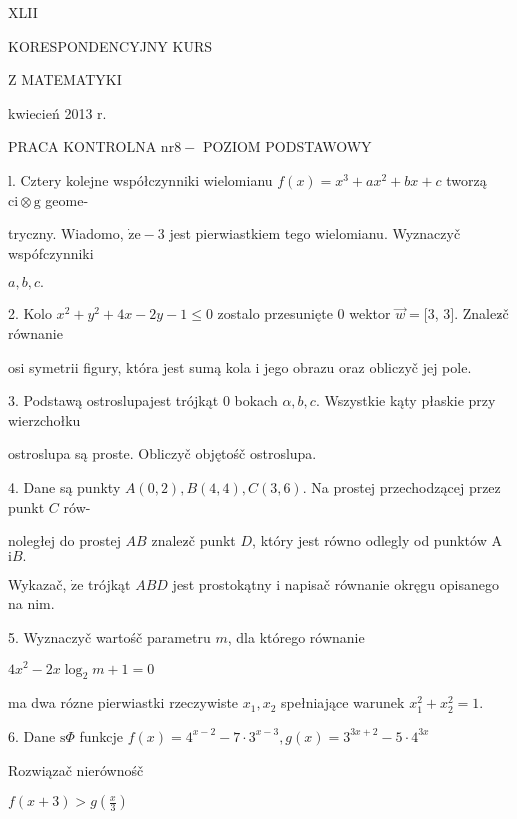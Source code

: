 \documentclass[a4paper,12pt]{article}
\begin{document}
XLII

KORESPONDENCYJNY KURS

Z MATEMATYKI

kwiecień 2013 r.

PRACA KONTROLNA $\mathrm{n}\mathrm{r} 8-$ POZIOM PODSTAWOWY

l. Cztery kolejne współczynniki wielomianu $f(x)=x^{3}+ax^{2}+bx+c$ tworzą $\mathrm{c}\mathrm{i}\otimes \mathrm{g}$ geome-

tryczny. Wiadomo, $\dot{\mathrm{z}}\mathrm{e}-3$ jest pierwiastkiem tego wielomianu. Wyznaczyč wspófczynniki

$a, b, c.$

2. Kolo $x^{2}+y^{2}+4x-2y-1\leq 0$ zostalo przesunięte $0$ wektor $\vec{w}=[3$, 3$]$. Znalez$\acute{}$č równanie

osi symetrii figury, która jest sumą kola $\mathrm{i}$ jego obrazu oraz obliczyč jej pole.

3. Podstawą ostroslupajest trójkąt $0$ bokach $\alpha, b, c$. Wszystkie kąty płaskie przy wierzchołku

ostroslupa są proste. Obliczyč objętośč ostroslupa.

4. Dane są punkty $A(0,2), B(4,4), C(3,6)$. Na prostej przechodzącej przez punkt $C$ rów-

noległej do prostej $AB$ znalez$\acute{}$č punkt $D$, który jest równo odlegly od punktów A $\mathrm{i}B.$

Wykazač, $\dot{\mathrm{z}}\mathrm{e}$ trójkąt $ABD$ jest prostokątny $\mathrm{i}$ napisač równanie okręgu opisanego na nim.

5. Wyznaczyč wartośč parametru $m$, dla którego równanie

$4x^{2}-2x\log_{2}m+1=0$

ma dwa rózne pierwiastki rzeczywiste $x_{1}, x_{2}$ spełniające warunek $x_{1}^{2}+x_{2}^{2}=1.$

6. Dane $\mathrm{s}\Phi$ funkcje $f(x)=4^{x-2}-7\cdot 3^{x-3}, g(x)=3^{3x+2}-5\cdot 4^{3x}$

Rozwiązač nierównośč

$f(x+3)>g(\displaystyle \frac{x}{3})$
\end{document}
